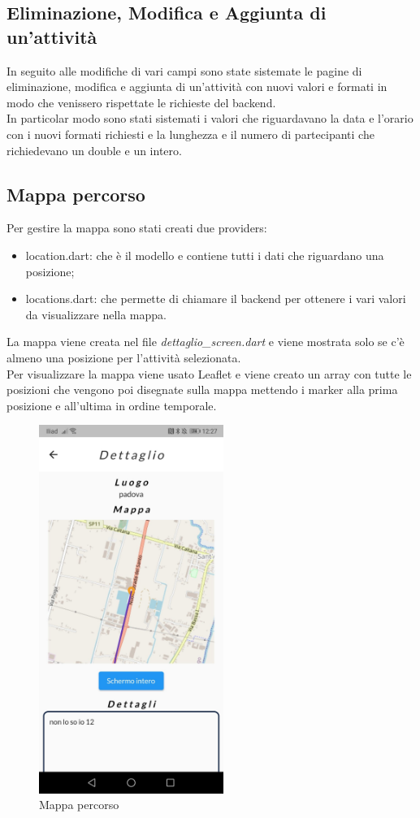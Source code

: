 \subsection{Eliminazione, Modifica e Aggiunta di un'attività}
In seguito alle modifiche di vari campi sono state sistemate le pagine di eliminazione, modifica e aggiunta di un'attività con nuovi valori e formati in modo che venissero rispettate le richieste del backend.\\
In particolar modo sono stati sistemati i valori che riguardavano la data e l'orario con i nuovi formati richiesti e la lunghezza e il numero di partecipanti che richiedevano un double e un intero.

\newpage

\subsection{Mappa percorso}
Per gestire la mappa sono stati creati due providers:
\begin{itemize}
	\item location.dart: che è il modello e contiene tutti i dati che riguardano una posizione;
	\item locations.dart: che permette di chiamare il backend per ottenere i vari valori da visualizzare nella mappa.
\end{itemize}
La mappa viene creata nel file \textit{dettaglio\_screen.dart} e viene mostrata solo se c'è almeno una posizione per l'attività selezionata.\\
Per visualizzare la mappa viene usato Leaflet e viene creato un array con tutte le posizioni che vengono poi disegnate sulla mappa mettendo i marker alla prima posizione e all'ultima in ordine temporale.\\

\begin{figure}[htbp]	
	\centering
	\includegraphics[width=6cm]{immagini/mappa.jpeg}
	\caption{Mappa percorso}
	\label{fig:Mappa percorso}
\end{figure}

